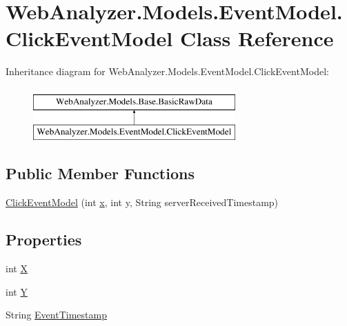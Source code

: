 \hypertarget{class_web_analyzer_1_1_models_1_1_event_model_1_1_click_event_model}{}\section{Web\+Analyzer.\+Models.\+Event\+Model.\+Click\+Event\+Model Class Reference}
\label{class_web_analyzer_1_1_models_1_1_event_model_1_1_click_event_model}
Inheritance diagram for Web\+Analyzer.\+Models.\+Event\+Model.\+Click\+Event\+Model\+:\begin{figure}[H]
\begin{center}
\leavevmode
\includegraphics[height=2.000000cm]{class_web_analyzer_1_1_models_1_1_event_model_1_1_click_event_model}
\end{center}
\end{figure}
\subsection*{Public Member Functions}
\begin{DoxyCompactItemize}
\item 
\hyperlink{class_web_analyzer_1_1_models_1_1_event_model_1_1_click_event_model_aaf3dff8e6eb97eb9b585e91f3999927d}{Click\+Event\+Model} (int \hyperlink{_u_i_2_h_t_m_l_resources_2js_2lib_2underscore_8min_8js_a81e910173af87b1161e719a504d52407}{x}, int y, String server\+Received\+Timestamp)
\end{DoxyCompactItemize}
\subsection*{Properties}
\begin{DoxyCompactItemize}
\item 
int \hyperlink{class_web_analyzer_1_1_models_1_1_event_model_1_1_click_event_model_a6d3d1e265eda3d709b09df33b60188f1}{X}
\item 
int \hyperlink{class_web_analyzer_1_1_models_1_1_event_model_1_1_click_event_model_a304a5fe726ae3cfc26cc7659315ca7eb}{Y}
\item 
String \hyperlink{class_web_analyzer_1_1_models_1_1_event_model_1_1_click_event_model_aa41e2fba46ac94e35b54c5129506aa24}{Event\+Timestamp}
\end{DoxyCompactItemize}
